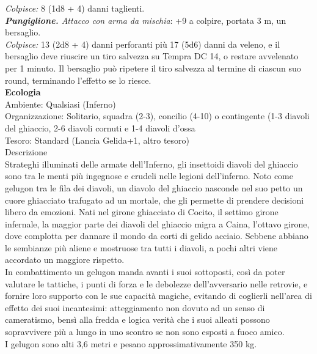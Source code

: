 \begin{multicols}{2}
\emph{Colpisce:} 8 (1d8 + 4) danni taglienti.\\
\emph{\textbf{Pungiglione.} Attacco con arma da mischia}: +9 a colpire, portata 3 m, un bersaglio.\\
\emph{Colpisce:} 13 (2d8 + 4) danni perforanti più 17 (5d6) danni da veleno, e il bersaglio deve riuscire un tiro salvezza su Tempra DC 14, o restare avvelenato per 1 minuto. Il bersaglio può ripetere il tiro salvezza al termine di ciascun suo round, terminando l'effetto se lo riesce.\\
\textbf{Ecologia}\\
Ambiente: Qualsiasi (Inferno)\\
Organizzazione: Solitario, squadra (2-3), concilio (4-10) o contingente (1-3 diavoli del ghiaccio, 2-6 diavoli cornuti e 1-4 diavoli d'ossa\\
Tesoro: Standard (Lancia Gelida+1, altro tesoro)\\
Descrizione\\
Strateghi illuminati delle armate dell’Inferno, gli insettoidi diavoli del ghiaccio sono tra le menti più ingegnose e crudeli nelle legioni dell'inferno. Noto come gelugon tra le fila dei diavoli, un diavolo del ghiaccio nasconde nel suo petto un cuore ghiacciato trafugato ad un mortale, che gli permette di prendere decisioni libero da emozioni. Nati nel girone ghiacciato di Cocito, il settimo girone infernale, la maggior parte dei diavoli del ghiaccio migra a Caina, l’ottavo girone, dove complotta per dannare il mondo da corti di gelido acciaio. Sebbene abbiano le sembianze più aliene e mostruose tra tutti i diavoli, a pochi altri viene accordato un maggiore rispetto.\\
In combattimento un gelugon manda avanti i suoi sottoposti, così da poter valutare le tattiche, i punti di forza e le debolezze dell’avversario nelle retrovie, e fornire loro supporto con le sue capacità magiche, evitando di coglierli nell'area di effetto dei suoi incantesimi: atteggiamento non dovuto ad un senso di cameratismo, bensì alla fredda e logica verità che i suoi alleati possono sopravvivere più a lungo in uno scontro se non sono esposti a fuoco amico.\\
I gelugon sono alti 3,6 metri e pesano approssimativamente 350 kg.\\


\end{multicols}
